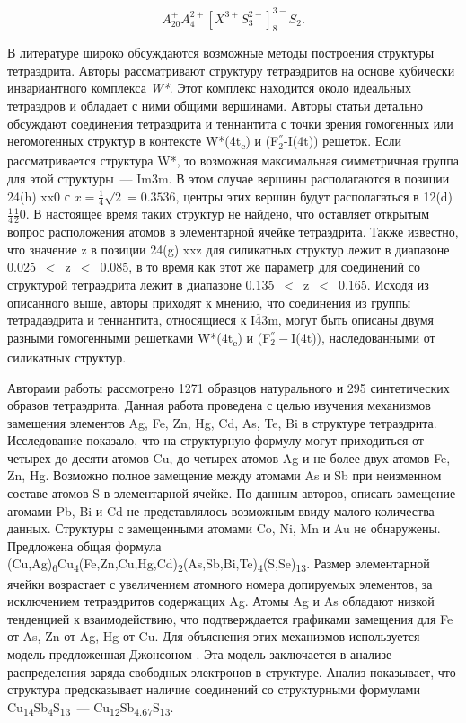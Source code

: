 \begin{equation}
  \label{eq:equation3}
  A^+_{20}A^{2+}_4[X^{3+}S^{2-}_{3}]^{3-}_{8}S_2.
\end{equation}



В литературе широко обсуждаются возможные методы построения структуры тетраэдрита. Авторы \cite{Koch_1981} рассматривают структуру тетраэдритов на основе кубически инвариантного комплекса  \textit{W*}. Этот комплекс находится около идеальных тетраэдров и обладает с ними общими вершинами.
Авторы статьи детально обсуждают соединения тетраэдрита и теннантита с точки зрения гомогенных или негомогенных структур в контексте W*(4t\textsubscript{c}) и (F$^{''}_{2}$-I(4t)) решеток.
Если рассматривается структура W*, то возможная максимальная симметричная группа для этой структуры~--- Im3m. В этом случае вершины располагаются в позиции 24(h) xx0 с $x = \frac{1}{4}\sqrt{2} = 0.3536$, центры этих вершин будут располагаться в 12(d) $\frac{1}{4}\frac{1}{2}0$.
В настоящее время таких структур не найдено, что оставляет открытым вопрос расположения атомов в элементарной ячейке тетраэдрита.
Также известно, что значение  z в позиции 24(g) xxz для силикатных структур лежит в диапазоне 0.025~$<$~z~$<$~0.085, в то время как этот же параметр для соединений со структурой тетраэдрита лежит в диапазоне 0.135~$<$~z~$<$~0.165.
Исходя из описанного выше, авторы приходят к мнению, что соединения из группы тетрадаэдрита и теннантита, относящиеся к I$\overline{\!4}$3m, могут быть описаны двумя разными гомогенными решетками W*(4t\textsubscript{c}) и (F$^{''}_{2}-$I(4t)), наследованными от силикатных структур.


Авторами работы \cite{Johnson1986} рассмотрено 1271 образцов натурального  и 295 синтетических образов тетраэдрита. Данная работа проведена с целью изучения механизмов замещения элементов Ag, Fe, Zn, Hg, Cd, As, Te, Bi в структуре тетраэдрита. Исследование показало, что на структурную формулу могут приходиться от четырех до десяти атомов Cu,  до четырех атомов Ag и не более двух атомов Fe, Zn, Hg. Возможно полное замещение между атомами As и Sb при неизменном составе атомов S в элементарной ячейке.
По данным авторов, описать замещение атомами Pb, Bi и Cd не представлялось возможным ввиду малого количества данных. Структуры с замещенными атомами Co, Ni, Mn и Au не обнаружены. Предложена общая формула (Cu,Ag)\textsubscript{6}Cu\textsubscript{4}(Fe,Zn,Cu,Hg,Cd)\textsubscript{2}(As,Sb,Bi,Te)\textsubscript{4}(S,Se)\textsubscript{13}. Размер элементарной ячейки возрастает с увеличением атомного номера допируемых элементов, за исключением тетраэдритов содержащих Ag. Атомы Ag и As обладают низкой тенденцией к взаимодействию, что подтверждается графиками замещения для Fe от As, Zn от Ag, Hg от Cu. Для объяснения этих механизмов используется модель предложенная Джонсоном \cite{johnson1983brillouin}. Эта модель заключается в анализе распределения заряда свободных электронов в структуре. Анализ показывает, что структура предсказывает наличие соединений со структурными формулами  Cu\textsubscript{14}Sb\textsubscript{4}S\textsubscript{13}~--- Cu\textsubscript{12}Sb\textsubscript{4.67}S\textsubscript{13}.

